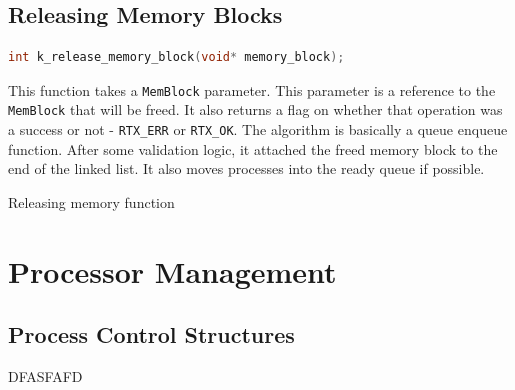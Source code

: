\documentclass[12pt]{report}
\begin{document}
\subsection{Releasing Memory Blocks}

\begin{minipage}{\textwidth}
\begin{lstlisting}[language=C, frame=single]
int k_release_memory_block(void* memory_block);
\end{lstlisting}
\end{minipage}

This function takes a \texttt{MemBlock} parameter. This parameter is a reference to the \texttt{MemBlock} that will be freed. It also returns a flag on whether that operation was a success or not - \texttt{RTX_ERR} or \texttt{RTX_OK}. The algorithm is basically a queue enqueue function. After some validation logic, it attached the freed memory block to the end of the linked list. It also moves processes into the ready queue if possible.

\begin{algorithm}[H]
  \caption{Releasing memory function}
  \begin{algorithmic}[1]
	  \EndIf
	  \EndIf
	  \EndIf
	  \EndIf
    \EndProcedure
  \end{algorithmic}
\end{algorithm}

\pagebreak



\section{Processor Management}

\subsection{Process Control Structures}
DFASFAFD
\end{document}
